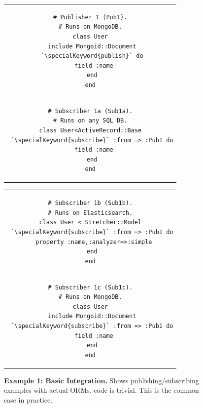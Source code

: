 \begin{figure}[t]
\begin{tabular}{c}
\begin{minipage}{.22\textwidth}
\begin{lstlisting}[xleftmargin=1pt,framexleftmargin=1pt]
# Publisher 1 (Pub1).
# Runs on MongoDB.
class User
 include Mongoid::Document
 `\specialKeyword{publish}` do
  field :name
 end
end
\end{lstlisting}
\end{minipage}\vspace{-8pt}\\
\begin{minipage}{.22\textwidth}
\begin{lstlisting}[xleftmargin=1pt,framexleftmargin=1pt]
# Subscriber 1a (Sub1a).
# Runs on any SQL DB.
class User<ActiveRecord::Base
 `\specialKeyword{subscribe}` :from => :Pub1 do
  field :name
 end
end
\end{lstlisting}
\end{minipage}
\end{tabular}\hfill
\begin{tabular}{c}
\begin{minipage}{0.22\textwidth}
\begin{lstlisting}[xleftmargin=1pt,framexleftmargin=1pt]
# Subscriber 1b (Sub1b).
# Runs on Elasticsearch.
class User < Stretcher::Model
 `\specialKeyword{subscribe}` :from => :Pub1 do
  property :name,:analyzer=>:simple
 end
end
\end{lstlisting}
\end{minipage}\vspace{-8pt}\\
\begin{minipage}{0.22\textwidth}
\begin{lstlisting}[xleftmargin=1pt,framexleftmargin=1pt]
# Subscriber 1c (Sub1c).
# Runs on MongoDB.
class User
 include Mongoid::Document
 `\specialKeyword{subscribe}` :from => :Pub1 do
  field :name
 end
end
\end{lstlisting}
\end{minipage}
\end{tabular}
\vspace{-16pt}
\caption{{\bf Example 1: Basic Integration.}
Shows publishing/subscribing examples with actual ORMs.
\synapse code is trivial.  This is the common case in practice.
}
\label{synapse:fig:mongo-to-star}
\end{figure}

